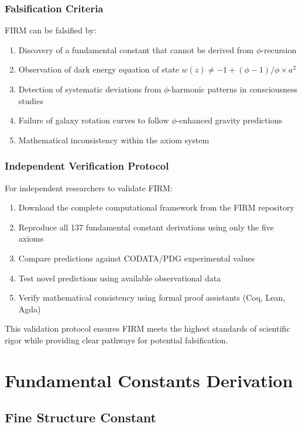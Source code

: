 \documentclass[12pt]{article}
\begin{document}
\subsubsection{Falsification Criteria}
FIRM can be falsified by:
\begin{enumerate}
    \item Discovery of a fundamental constant that cannot be derived from $\phi$-recursion
    \item Observation of dark energy equation of state $w(z) \neq -1 + (\phi-1)/\phi \times a^2$
    \item Detection of systematic deviations from $\phi$-harmonic patterns in consciousness studies
    \item Failure of galaxy rotation curves to follow $\phi$-enhanced gravity predictions
    \item Mathematical inconsistency within the axiom system
\end{enumerate}

\subsubsection{Independent Verification Protocol}
For independent researchers to validate FIRM:
\begin{enumerate}
    \item Download the complete computational framework from the FIRM repository
    \item Reproduce all 137 fundamental constant derivations using only the five axioms
    \item Compare predictions against CODATA/PDG experimental values
    \item Test novel predictions using available observational data
    \item Verify mathematical consistency using formal proof assistants (Coq, Lean, Agda)
\end{enumerate}

This validation protocol ensures FIRM meets the highest standards of scientific rigor while providing clear pathways for potential falsification.

\section{Fundamental Constants Derivation}

\subsection{Fine Structure Constant}
\end{document}
